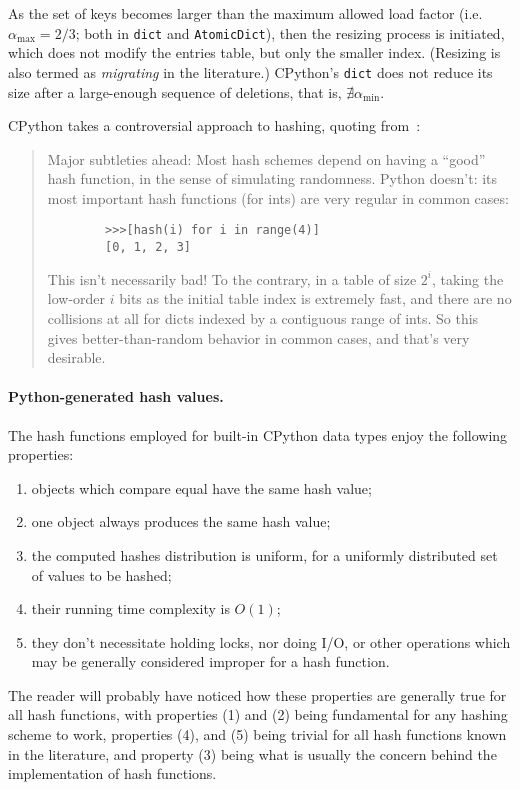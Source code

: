 As the set of keys becomes larger than the maximum allowed load factor (i.e.\ $\alpha_{\max} = 2/3$; both in \texttt{dict} and \texttt{AtomicDict}), then the resizing process is initiated, which does not modify the entries table, but only the smaller index.
(Resizing is also termed as \emph{migrating} in the literature.)
CPython's \texttt{dict} does not reduce its size after a large-enough sequence of deletions, that is, $\nexists\alpha_{\min}$.

CPython takes a controversial approach to hashing, quoting from~\cite{dict-comment-hash}:
\begin{quote}
	Major subtleties ahead:  Most hash schemes depend on having a ``good'' hash function, in the sense of simulating randomness.
	Python doesn't:  its most important hash functions (for ints) are very regular in common cases:
	\begin{verbatim}
		>>>[hash(i) for i in range(4)]
	  	[0, 1, 2, 3]
	\end{verbatim}
	This isn't necessarily bad!
	To the contrary, in a table of size $2^i$, taking the low-order $i$ bits as the initial table index is extremely fast, and there are no collisions at all for dicts indexed by a contiguous range of ints.
	So this gives better-than-random behavior in common cases, and that's very desirable.
\end{quote}


\paragraph{Python-generated hash values.}
The hash functions employed for built-in CPython data types enjoy the following properties:
\begin{enumerate}
	\item objects which compare equal have the same hash value;
	\item one object always produces the same hash value;
	\item the computed hashes distribution is uniform, for a uniformly distributed set of values to be hashed;
	\item their running time complexity is $O(1)$;
	\item they don't necessitate holding locks, nor doing I/O, or other operations which may be generally considered improper for a hash function.
\end{enumerate}
The reader will probably have noticed how these properties are generally true for all hash functions, with properties (1) and (2) being fundamental for any hashing scheme to work, properties (4), and (5) being trivial for all hash functions known in the literature, and property (3) being what is usually the concern behind the implementation of hash functions.

